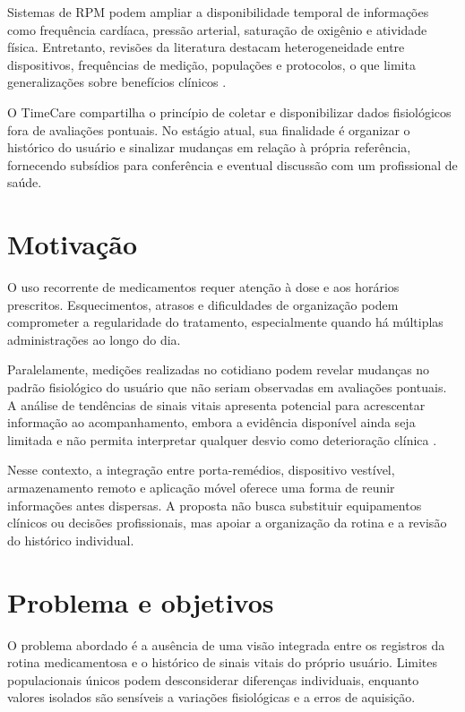 \documentclass[12pt]{article}
\begin{document}
Sistemas de RPM podem ampliar a disponibilidade temporal de informações como frequência cardíaca, pressão arterial, saturação de oxigênio e atividade física. Entretanto, revisões da literatura destacam heterogeneidade entre dispositivos, frequências de medição, populações e protocolos, o que limita generalizações sobre benefícios clínicos \cite{leenen2020current}.

O TimeCare compartilha o princípio de coletar e disponibilizar dados fisiológicos fora de avaliações pontuais. No estágio atual, sua finalidade é organizar o histórico do usuário e sinalizar mudanças em relação à própria referência, fornecendo subsídios para conferência e eventual discussão com um profissional de saúde.

\section{Motivação}\label{sec:firstpage}

O uso recorrente de medicamentos requer atenção à dose e aos horários prescritos. Esquecimentos, atrasos e dificuldades de organização podem comprometer a regularidade do tratamento, especialmente quando há múltiplas administrações ao longo do dia.

Paralelamente, medições realizadas no cotidiano podem revelar mudanças no padrão fisiológico do usuário que não seriam observadas em avaliações pontuais. A análise de tendências de sinais vitais apresenta potencial para acrescentar informação ao acompanhamento, embora a evidência disponível ainda seja limitada e não permita interpretar qualquer desvio como deterioração clínica \cite{brekke2019value}.

Nesse contexto, a integração entre porta-remédios, dispositivo vestível, armazenamento remoto e aplicação móvel oferece uma forma de reunir informações antes dispersas. A proposta não busca substituir equipamentos clínicos ou decisões profissionais, mas apoiar a organização da rotina e a revisão do histórico individual.

\section{Problema e objetivos}

O problema abordado é a ausência de uma visão integrada entre os registros da rotina medicamentosa e o histórico de sinais vitais do próprio usuário. Limites populacionais únicos podem desconsiderar diferenças individuais, enquanto valores isolados são sensíveis a variações fisiológicas e a erros de aquisição.
\end{document}
